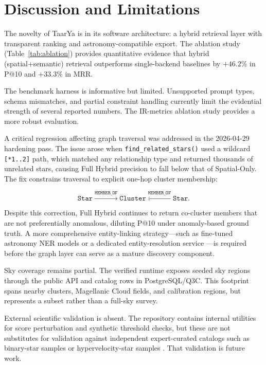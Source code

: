 \documentclass[preprint,12pt,authoryear]{elsarticle}
\begin{document}
\section{Discussion and Limitations}
\label{sec:discussion}

The novelty of \textsf{TaarYa} is in its software architecture: a hybrid retrieval layer with transparent ranking and astronomy-compatible export. The ablation study (Table~\ref{tab:ablation}) provides quantitative evidence that hybrid (spatial+semantic) retrieval outperforms single-backend baselines by $+46.2\%$ in P@10 and $+33.3\%$ in MRR.

The benchmark harness is informative but limited. Unsupported prompt types, schema mismatches, and partial constraint handling currently limit the evidential strength of several reported numbers. The IR-metrics ablation study provides a more robust evaluation.

A critical regression affecting graph traversal was addressed in the 2026-04-29 hardening pass. The issue arose when \texttt{find\allowbreak\_related\allowbreak\_stars()} used a wildcard \texttt{[*1..2]} path, which matched any relationship type and returned thousands of unrelated stars, causing Full Hybrid precision to fall below that of Spatial-Only. The fix constrains traversal to explicit one-hop cluster membership:


\[
\texttt{Star}\xrightarrow{\texttt{MEMBER\_OF}}\texttt{Cluster}\xleftarrow{\texttt{MEMBER\_OF}}\texttt{Star}.
\]


Despite this correction, Full Hybrid continues to return co-cluster members that are not preferentially anomalous, diluting P@10 under anomaly-based ground truth. A more comprehensive entity-linking strategy—such as fine-tuned astronomy NER models or a dedicated entity-resolution service \citep{Shen2015}—is required before the graph layer can serve as a mature discovery component.

Sky coverage remains partial. The verified runtime exposes \nClusterNodes{} seeded sky regions through the public API and \nStarsReal{} catalog rows in PostgreSQL/Q3C. This footprint spans nearby clusters, Magellanic Cloud fields, and calibration regions, but represents a subset rather than a full-sky survey.

External scientific validation is absent. The repository contains internal utilities for score perturbation and synthetic threshold checks, but these are not substitutes for validation against independent expert-curated catalogs such as binary-star samples \citep{ElBadry2021} or hypervelocity-star samples \citep{Brown2015}. That validation is future work.
\end{document}
